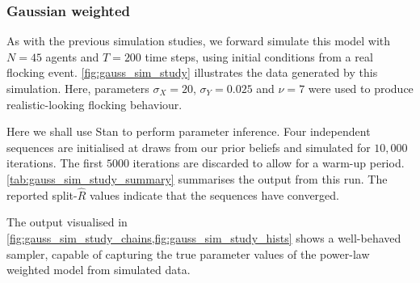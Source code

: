 \subsubsection{Gaussian weighted}

As with the previous simulation studies, we forward simulate this model with $N=45$ agents
and $T=200$ time steps, using initial conditions from a real flocking event.
\cref{fig:gauss_sim_study} illustrates the data generated by this simulation. Here,
parameters $\sigma_X=20$, $\sigma_Y=0.025$ and $\nu=7$ were used to produce
realistic-looking flocking behaviour.

Here we shall use Stan to perform parameter inference. Four independent sequences are
initialised at draws from our prior beliefs and simulated for $10,000$ iterations. The
first $5000$ iterations are discarded to allow for a warm-up period.
\cref{tab:gauss_sim_study_summary} summarises the output from this run.  The reported
split-$\widehat{R}$ values indicate that the sequences have converged.

The output visualised in \cref{fig:gauss_sim_study_chains,fig:gauss_sim_study_hists} shows
a well-behaved sampler, capable of capturing the true parameter values of the power-law
weighted model from simulated data.

